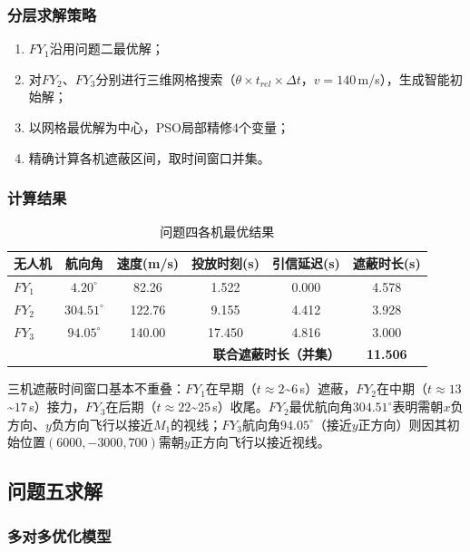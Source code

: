 \documentclass[12pt,a4paper]{article}
\begin{document}
\subsubsection{分层求解策略}

\begin{enumerate}[nosep]
  \item $FY_1$沿用问题二最优解；
  \item 对$FY_2$、$FY_3$分别进行三维网格搜索（$\theta \times t_{rel} \times \Delta t$，$v=140$\,m/s），生成智能初始解；
  \item 以网格最优解为中心，PSO局部精修4个变量；
  \item 精确计算各机遮蔽区间，取时间窗口并集。
\end{enumerate}

\subsubsection{计算结果}

\begin{table}[H]
\centering
\caption{问题四各机最优结果}
\begin{tabular}{lccccc}
\toprule
无人机 & 航向角 & 速度(m/s) & 投放时刻(s) & 引信延迟(s) & 遮蔽时长(s) \\
\midrule
$FY_1$ & $4.20^\circ$ & 82.26 & 1.522 & 0.000 & 4.578 \\
$FY_2$ & $304.51^\circ$ & 122.76 & 9.155 & 4.412 & 3.928 \\
$FY_3$ & $94.05^\circ$ & 140.00 & 17.450 & 4.816 & 3.000 \\
\midrule
\multicolumn{5}{r}{\textbf{联合遮蔽时长（并集）}} & \textbf{11.506} \\
\bottomrule
\end{tabular}
\end{table}

三机遮蔽时间窗口基本不重叠：$FY_1$在早期（$t\approx2$\textasciitilde$6$\,s）遮蔽，$FY_2$在中期（$t\approx13$\textasciitilde$17$\,s）接力，$FY_3$在后期（$t\approx22$\textasciitilde$25$\,s）收尾。$FY_2$最优航向角$304.51^\circ$表明需朝$x$负方向、$y$负方向飞行以接近$M_1$的视线；$FY_3$航向角$94.05^\circ$（接近$y$正方向）则因其初始位置$(6000, -3000, 700)$需朝$y$正方向飞行以接近视线。

\subsection{问题五求解}

\subsubsection{多对多优化模型}
\end{document}
